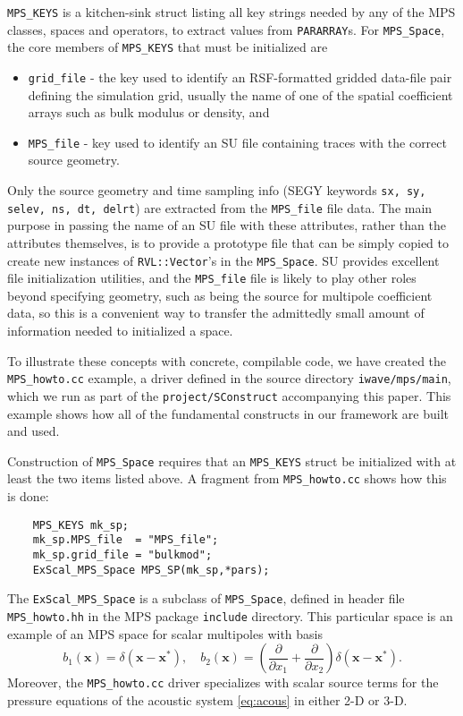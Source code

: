 {\tt MPS\_KEYS} is a kitchen-sink struct listing all key strings needed by any of the MPS classes, spaces and operators, to extract values from {\tt  PARARRAY}s.
For {\tt MPS\_Space}, the core members of {\tt MPS\_KEYS} that must be initialized are
\begin{itemize}
	\item {\tt grid\_file} - the key used to identify an RSF-formatted gridded data-file pair defining the simulation grid, usually the name of one of the spatial coefficient arrays such as bulk modulus or density, and
	\item {\tt MPS\_file} - key used to identify an SU file containing traces with the correct source geometry.
\end{itemize}
Only the source geometry and time sampling info (SEGY keywords {\tt sx, sy, selev, ns, dt, delrt}) are extracted from the {\tt MPS\_file} file data. 
The main purpose in passing the name of an SU file with these attributes, rather than the attributes
themselves, is to provide a prototype file that can be simply copied to create new instances of {\tt RVL::Vector}'s in the {\tt MPS\_Space}. 
SU provides excellent file initialization utilities, and the {\tt MPS\_file} file is likely to play other roles beyond specifying geometry, such as being the source for multipole coefficient data, so this is a convenient way to transfer the admittedly small amount of information needed to initialized a space.

To illustrate these concepts with concrete, compilable code, we have created the {\tt MPS\_howto.cc} example, a driver defined in  the source directory {\tt iwave/mps/main}, 
which we run as part of the {\tt project/SConstruct} accompanying this paper. 
This example shows how all of the fundamental
constructs in our framework are built and used.

Construction of {\tt MPS\_Space} requires that an {\tt MPS\_KEYS}
struct be initialized with at least the two items listed above. A
fragment from {\tt MPS\_howto.cc} shows how this is done:
{\small
\begin{verbatim}
    MPS_KEYS mk_sp;
    mk_sp.MPS_file  = "MPS_file"; 
    mk_sp.grid_file = "bulkmod";  
    ExScal_MPS_Space MPS_SP(mk_sp,*pars);
\end{verbatim}
}
The {\tt ExScal\_MPS\_Space} is a subclass of {\tt MPS\_Space}, defined in header file {\tt MPS\_howto.hh} in the MPS package {\tt include} directory. 
This particular space is an example of an MPS space for scalar multipoles with basis
\[
	b_1(\mathbf x) = \delta(\mathbf x-\mathbf x^*),\quad b_2(\mathbf x) = \left(\frac{\partial}{\partial x_1} + \frac{\partial}{\partial x_2}\right)\delta(\mathbf x-\mathbf x^*).
\]
Moreover, the {\tt MPS\_howto.cc} driver specializes with scalar source terms for the pressure equations of the acoustic system \ref{eq:acous} in either 2-D or 3-D. 

